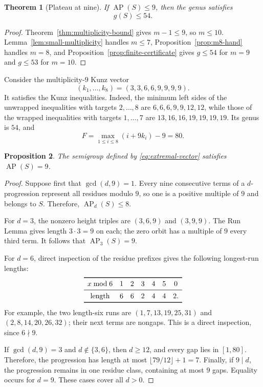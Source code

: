 \documentclass[11pt]{article}
\theoremstyle{plain}
\newtheorem{theorem}{Theorem}[section]
\newtheorem{proposition}[theorem]{Proposition}
\theoremstyle{definition}
\theoremstyle{remark}
\newcommand{\AP}{\operatorname{AP}}
\begin{document}
\begin{theorem}[Plateau at nine]\label{thm:plateau-nine}
If $\AP(S)\leq9$, then the genus satisfies
\[
  \boxed{g(S)\leq54.}
\]
\end{theorem}

\begin{proof}
Theorem~\ref{thm:multiplicity-bound} gives $m-1\leq9$, so $m\leq10$.
Lemma~\ref{lem:small-multiplicity} handles $m\leq7$,
Proposition~\ref{prop:m8-hand} handles $m=8$, and
Proposition~\ref{prop:finite-certificate} gives $g\leq54$ for $m=9$ and
$g\leq53$ for $m=10$.
\end{proof}

Consider the multiplicity-$9$ Kunz vector
\begin{equation}\label{eq:extremal-vector}
  (k_1,\ldots,k_8)=(3,3,6,6,9,9,9,9).
\end{equation}
It satisfies the Kunz inequalities.  Indeed, the minimum left sides of the
unwrapped inequalities with targets $2,\ldots,8$ are
$6,6,6,9,9,12,12$, while those of the wrapped inequalities with targets
$1,\ldots,7$ are $13,16,16,19,19,19,19$.  Its genus is $54$, and
\[
  F=\max_{1\leq i\leq8}(i+9k_i)-9=80.
\]

\begin{proposition}\label{prop:sharpness-nine}
The semigroup defined by \eqref{eq:extremal-vector} satisfies $\AP(S)=9$.
\end{proposition}

\begin{proof}
Suppose first that $\gcd(d,9)=1$.  Every nine consecutive terms of a
$d$-progression
represent all residues modulo $9$, so one is a positive multiple of $9$ and
belongs to $S$.  Therefore, $\AP_d(S)\leq8$.

For $d=3$, the nonzero height triples are $(3,6,9)$ and $(3,9,9)$.  The Run
Lemma gives length $3\cdot3=9$ on each; the zero orbit has a multiple of $9$
every third term.  It follows that $\AP_3(S)=9$.

For $d=6$, direct inspection of the residue prefixes gives the following
longest-run lengths:
\[
\begin{array}{c*{6}{c}}
  \toprule
  x\bmod6&1&2&3&4&5&0\\
  \midrule
  \text{length}&6&6&2&4&4&2.\\
  \bottomrule
\end{array}
\]
For example, the two length-six runs are
$(1,7,13,19,25,31)$ and $(2,8,14,20,26,32)$; their next terms are nongaps.
This is a direct inspection, since $6\nmid9$.

If $\gcd(d,9)=3$ and $d\notin\{3,6\}$, then $d\geq12$, and every gap lies
in $[1,80]$.  Therefore, the progression has length at most
$\lfloor79/12\rfloor+1=7$.  Finally, if $9\mid d$, the progression remains
in one residue class, containing at most $9$ gaps.  Equality occurs for
$d=9$.  These cases cover all $d>0$.
\end{proof}
\end{document}
